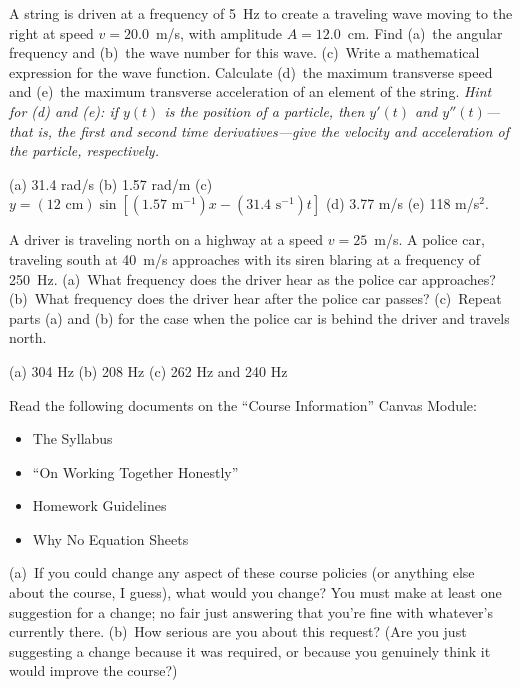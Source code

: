 \begin{Exercise}
A string is driven at a frequency of 5~Hz to create a traveling wave moving to the right at speed $v=20.0$~m/s, with amplitude $A=12.0$~cm.  
Find (a)~the angular frequency and (b)~the wave number for this wave.  
(c)~Write a mathematical expression for the wave function.  
Calculate (d)~the maximum transverse speed and (e)~the maximum transverse acceleration of an element of the string. \textit{Hint for (d) and (e): if $y(t)$ is the position of a particle, then $y'(t)$ and $y''(t)$---that is, the first and second time derivatives---give the velocity and acceleration of the particle, respectively.}
\end{Exercise}
\begin{Answer}
(a) 31.4 rad/s (b) 1.57 rad/m (c) $y=(12\text{ cm}) \sin \left[ (1.57\text{ m}^{-1})x - (31.4\text{ s}^{-1})t \right] $ (d) 3.77 m/s 
(e) 118 m/s$^2$.
\end{Answer}


\begin{Exercise}
A driver is traveling north on a highway at a speed $v=25$~m/s.  
A police car, traveling south at 40~m/s approaches with its siren blaring at a frequency of 250~Hz.  
(a)~What frequency does the driver hear as the police car approaches? 
(b)~What frequency does the driver hear after the police car passes? 
(c)~Repeat parts (a) and (b) for the case when the police car is behind the driver and travels north.  
\end{Exercise}
\begin{Answer}
(a) 304 Hz (b) 208 Hz (c) 262 Hz and 240 Hz
\end{Answer}


\begin{Exercise}
Read the following documents on the ``Course Information'' Canvas Module:
\begin{itemize}[nosep, topsep=-2ex, after={\vspace{2ex}}]
\item The Syllabus
\item ``On Working Together Honestly''
\item Homework Guidelines
\item Why No Equation Sheets
\end{itemize}
(a)~If you could change any aspect of these course policies (or anything else about the course, I guess), what would you change?  
You must make at least one suggestion for a change; no fair just answering that you're fine with whatever's currently there.  
(b)~How serious are you about this request?  (Are you just suggesting a change because it was required, or because you genuinely think it would improve the course?) 
\end{Exercise}


